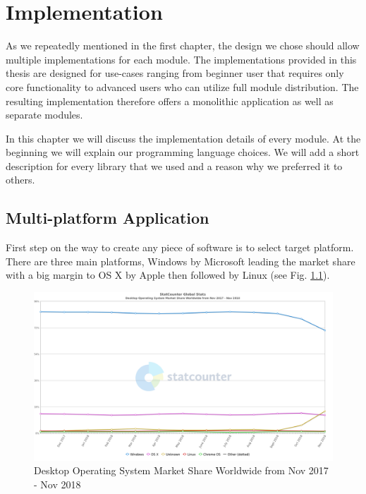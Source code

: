 \chapter{Implementation}

As we repeatedly mentioned in the first chapter, the design we chose should allow multiple implementations for each module. The implementations provided in this thesis are designed for use-cases ranging from beginner user that requires only core functionality to advanced users who can utilize full module distribution. The resulting implementation therefore offers a monolithic application as well as separate modules.
\par
In this chapter we will discuss the implementation details of every module. At the beginning we will explain our programming language choices. We will add a short description for every library that we used and a reason why we preferred it to others.

\section{Multi-platform Application}

First step on the way to create any piece of software is to select target platform. There are three main platforms, Windows by Microsoft leading the market share with a big margin to OS X by Apple then followed by Linux (see Fig. \ref{fig01:osMarketShareChart}).

\begin{figure}[ht]\centering
\includegraphics[width=1.0\textwidth]{img/StatCounter-os_combined-ww-monthly-201711-201811}
\caption{Desktop Operating System Market Share Worldwide from Nov 2017 - Nov 2018~\citep{osMarketShare}}
\label{fig01:osMarketShareChart}
\end{figure}

